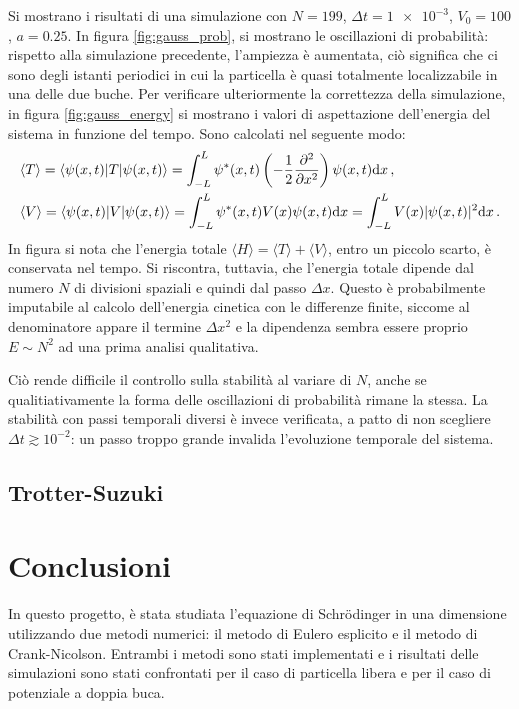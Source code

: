 \documentclass[a4paper, titlepage]{article}
\numberwithin{equation}{section}
\begin{document}
Si mostrano i risultati di una simulazione con $N = 199$, $\Delta t = \num{1e-3}$, $V_0 = 100$, $a = 0.25$. In figura \ref{fig:gauss_prob}, si mostrano le oscillazioni di probabilità: rispetto alla simulazione precedente, l'ampiezza è aumentata, ciò significa che ci sono degli istanti periodici in cui la particella è quasi totalmente localizzabile in una delle due buche. Per verificare ulteriormente la correttezza della simulazione, in figura \ref{fig:gauss_energy} si mostrano i valori di aspettazione dell'energia del sistema in funzione del tempo. Sono calcolati nel seguente modo:
\begin{align*}
    &\langle T \rangle = \langle \psi(x,t) | T | \psi(x,t) \rangle = \int_{-L}^{L} \psi^*(x,t) \left(-\frac{1}{2}\pdv[2]{x}\right)\psi(x,t) \dd x\, , \\
    &\langle V \rangle = \langle \psi(x,t) | V | \psi(x,t) \rangle = \int_{-L}^{L} \psi^*(x,t) V(x) \psi(x,t) \dd x = \int_{-L}^{L} V(x) |\psi(x,t)|^2 \dd x\, .
\end{align*}
In figura si nota che l'energia totale $\langle H \rangle = \langle T \rangle  + \langle V \rangle$, entro un piccolo scarto, è conservata nel tempo.
Si riscontra, tuttavia, che l'energia totale dipende dal numero $N$ di divisioni spaziali e quindi dal passo $\Delta x$. Questo è probabilmente imputabile al calcolo dell'energia cinetica con le differenze finite, siccome al denominatore appare il termine $\Delta x^2$ e la dipendenza sembra essere proprio $E \sim N^2$ ad una prima analisi qualitativa. 

Ciò rende difficile il controllo sulla stabilità al variare di $N$, anche se qualitiativamente la forma delle oscillazioni di probabilità rimane la stessa. La stabilità con passi temporali diversi è invece verificata, a patto di non scegliere $\Delta t \gtrsim 10^{-2}$: un passo troppo grande invalida l'evoluzione temporale del sistema.

\subsection{Trotter-Suzuki}




\section{Conclusioni}
In questo progetto, è stata studiata l'equazione di Schrödinger in una dimensione utilizzando due metodi numerici: il metodo di Eulero esplicito e il metodo di Crank-Nicolson. Entrambi i metodi sono stati implementati e i risultati delle simulazioni sono stati confrontati per il caso di particella libera e per il caso di potenziale a doppia buca.
\end{document}
